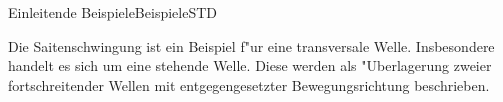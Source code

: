 \begin{MXContent}{Einleitende Beispiele}{Beispiele}{STD}

Die Saitenschwingung ist ein Beispiel f"ur eine transversale Welle. Insbesondere handelt es sich um eine stehende Welle. Diese werden als "Uberlagerung zweier fortschreitender Wellen mit entgegengesetzter Bewegungsrichtung beschrieben.

\end{MXContent}


